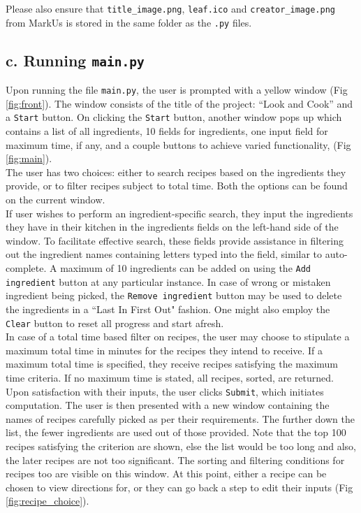 \documentclass[fontsize=11pt]{article}
\begin{document}
    Please also ensure that \texttt{title\_image.png}, \texttt{leaf.ico} and \texttt{creator\_image.png} from MarkUs is stored in the same folder as the \texttt{.py} files.

    \subsection*{c. Running \texttt{main.py}}

    Upon running the file \texttt{main.py}, the user is prompted with a yellow window (Fig \ref{fig:front}). The window consists of the title of the project: ``Look and Cook” and a \texttt{Start} button. On clicking the \texttt{Start} button, another window pops up which contains a list of all ingredients, 10 fields for ingredients, one input field for maximum time, if any, and a couple buttons to achieve varied functionality, (Fig \ref{fig:main}). \\

    The user has two choices: either to search recipes based on the ingredients they provide, or to filter recipes subject to total time. Both the options can be found on the current window. \\

    If user wishes to perform an ingredient-specific search, they input the ingredients they have in their kitchen in the ingredients fields on the left-hand side of the window. To facilitate effective search, these fields provide assistance in filtering out the ingredient names containing letters typed into the field, similar to auto-complete. A maximum of 10 ingredients can be added on using the \texttt{Add ingredient} button at any particular instance. In case of wrong or mistaken ingredient being picked, the \texttt{Remove ingredient} button may be used to delete the ingredients in a ``Last In First Out" fashion. One might also employ the \texttt{Clear} button to reset all progress and start afresh. \\

    In case of a total time based filter on recipes, the user may choose to stipulate a maximum total time in minutes for the recipes they intend to receive. If a maximum total time is specified, they receive recipes satisfying the maximum time criteria. If no maximum time is stated, all recipes, sorted, are returned. \\

    Upon satisfaction with their inputs, the user clicks \texttt{Submit}, which initiates computation. The user is then presented with a new window containing the names of recipes carefully picked as per their requirements. The further down the list, the fewer ingredients are used out of those provided. Note that the top 100 recipes satisfying the criterion are shown, else the list would be too long and also, the later recipes are not too significant. The sorting and filtering conditions for recipes too are visible on this window. At this point, either a recipe can be chosen to view directions for, or they can go back a step to edit their inputs (Fig \ref{fig:recipe_choice}). \\
\end{document}

